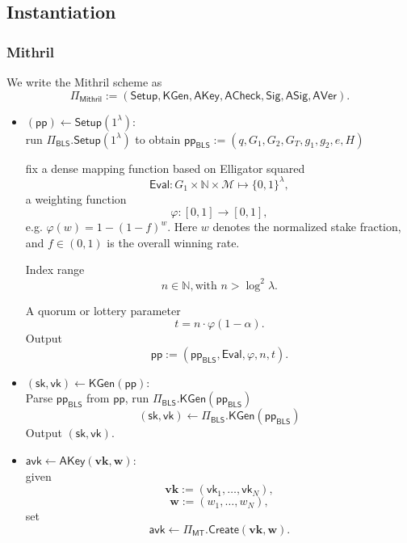 \documentclass{article}
\newcommand{\ppBLS}[0]{\mathsf{pp}_{\mathsf{BLS}}}
\newcommand{\pp}[0]{\mathsf{pp}}
\newcommand{\sk}[0]{\mathsf{sk}}
\newcommand{\vk}[0]{\mathsf{vk}}
\begin{document}
\subsection{Instantiation}

\subsubsection{Mithril}\label{sec:mithril}

We write the Mithril scheme as
\[
  \Pi_{\mathsf{Mithril}} :=(\mathsf{Setup}, \mathsf{KGen}, \mathsf{AKey}, \mathsf{ACheck}, \mathsf{Sig}, \mathsf{ASig}, \mathsf{AVer}).
\]

\begin{itemize}

  \item $(\pp ) \leftarrow \mathsf{Setup}(1^\lambda)$:\\
        run $\Pi_{\mathsf{BLS}}.\mathsf{Setup}(1^\lambda)$ to obtain $\ppBLS := (q,G_1,G_2,G_T,g_1,g_2,e,H)$
        
        fix a dense mapping function based on Elligator squared 
        \[
        \mathsf{Eval} : G_1 \times \mathbb{N} \times \mathcal{M}
        \mapsto \{0,1\}^\lambda,
        \]
        a weighting function
        \[
          \varphi : [0,1] \to [0,1],
        \]
        e.g. $\varphi(w) = 1-(1-f)^w$.
        Here $w$ denotes the normalized stake fraction, and $f\in(0,1)$ is the overall winning rate.

        Index range
        \[
          n \in \mathbb{N}, \text{with } n > \log^2\lambda.
        \]

        A quorum or lottery parameter
        \[
          t = n\cdot\varphi(1-\alpha).
        \]
        Output
        \[
          \mathsf{pp} :=(\ppBLS,\mathsf{Eval},\varphi,n,t).
        \]

  \item $(\sk,\vk) \leftarrow \mathsf{KGen}(\mathsf{pp})$:\\
        Parse $\ppBLS$ from $\pp$, run $\Pi_{\mathsf{BLS}}.\mathsf{KGen}(\ppBLS)$ 
        \[
          (\sk,\vk) \leftarrow \Pi_{\mathsf{BLS}}.\mathsf{KGen}(\ppBLS)
        \]
        Output $(\sk,\vk)$.

  \item $\mathsf{avk} \leftarrow \mathsf{AKey}(\mathbf{vk},\mathbf{w})$:\\
        given
        \[
          \mathbf{vk}:=(\vk_1,\dots,\vk_N),
        \]
        \[
          \mathbf{w}:=(w_1,\dots,w_N),
        \]
        set
        \[
          \mathsf{avk} \leftarrow \Pi_{\mathsf{MT}}.\mathsf{Create}(\mathbf{vk},\mathbf{w}).
        \]


\end{itemize}
\end{document}
